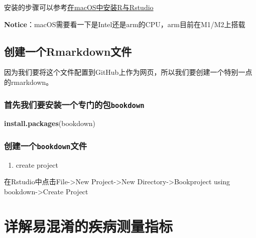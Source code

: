 \documentclass[
]{book}
\newenvironment{Shaded}{\begin{snugshade}}{\end{snugshade}}
\newcommand{\FunctionTok}[1]{\textcolor[rgb]{0.13,0.29,0.53}{\textbf{#1}}}
\newcommand{\NormalTok}[1]{#1}
\newcommand{\StringTok}[1]{\textcolor[rgb]{0.31,0.60,0.02}{#1}}
\providecommand{\tightlist}{%
  \setlength{\itemsep}{0pt}\setlength{\parskip}{0pt}}
\theoremstyle{definition}
\theoremstyle{definition}
\theoremstyle{definition}
\theoremstyle{definition}
\theoremstyle{remark}
\begin{document}
安装的步骤可以参考\href{https://zhuanlan.zhihu.com/p/687529684}{在macOS中安装R与Rstudio}

\textbf{Notice}：macOS需要看一下是Intel还是arm的CPU，arm目前在M1/M2上搭载

\hypertarget{ux521bux5efaux4e00ux4e2armarkdownux6587ux4ef6}{%
\section{创建一个Rmarkdown文件}\label{ux521bux5efaux4e00ux4e2armarkdownux6587ux4ef6}}

因为我们要将这个文件配置到GitHub上作为网页，所以我们要创建一个特别一点的rmarkdown。

\hypertarget{ux9996ux5148ux6211ux4eecux8981ux5b89ux88c5ux4e00ux4e2aux4e13ux95e8ux7684ux5305bookdown}{%
\subsection{\texorpdfstring{首先我们要安装一个专门的包\texttt{bookdown}}{首先我们要安装一个专门的包bookdown}}\label{ux9996ux5148ux6211ux4eecux8981ux5b89ux88c5ux4e00ux4e2aux4e13ux95e8ux7684ux5305bookdown}}

\begin{Shaded}
\begin{Highlighting}[]
\FunctionTok{install.packages}\NormalTok{(}\StringTok{\textquotesingle{}bookdown\textquotesingle{}}\NormalTok{)}
\end{Highlighting}
\end{Shaded}

\hypertarget{ux521bux5efaux4e00ux4e2abookdownux6587ux4ef6}{%
\subsection{\texorpdfstring{创建一个\texttt{bookdown}文件}{创建一个bookdown文件}}\label{ux521bux5efaux4e00ux4e2abookdownux6587ux4ef6}}

\begin{enumerate}
\def\labelenumi{\arabic{enumi}.}
\tightlist
\item
  create project
\end{enumerate}

在Rstudio中点击File-\textgreater New Project-\textgreater New Directory-\textgreater Bookproject using bookdown-\textgreater Create Project

\hypertarget{ux8be6ux89e3ux6613ux6df7ux6dc6ux7684ux75beux75c5ux6d4bux91cfux6307ux6807}{%
\chapter{详解易混淆的疾病测量指标}\label{ux8be6ux89e3ux6613ux6df7ux6dc6ux7684ux75beux75c5ux6d4bux91cfux6307ux6807}}
\end{document}
